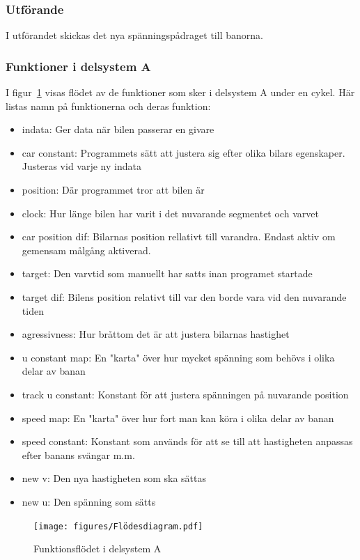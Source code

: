     \subsubsection{Utförande}

    	I utförandet skickas det nya spänningspådraget till banorna. 
	

    \subsubsection{Funktioner i delsystem A}
	I figur~\ref{fig:flow_diagram}  visas flödet av de funktioner som sker i delsystem A under en cykel.
	Här listas namn på funktionerna och deras funktion:
	\begin{itemize}
 		\item indata: Ger data när bilen passerar en givare
		\item car constant: Programmets sätt att justera sig efter olika bilars egenskaper. Justeras vid varje ny indata
 		\item position: Där programmet tror att bilen är
 		\item clock: Hur länge bilen har varit i det nuvarande segmentet och varvet
		\item car position dif: Bilarnas position rellativt till varandra. Endast aktiv om gemensam målgång aktiverad.
		\item target: Den varvtid som manuellt har satts inan programet startade
		\item target dif: Bilens position relativt till var den borde vara vid den nuvarande tiden
		\item agressivness: Hur bråttom det är att justera bilarnas hastighet 
		\item u constant map: En "karta" över hur mycket spänning som behövs i olika delar av banan
		\item track u constant: Konstant för att justera spänningen på nuvarande position
		\item speed map: En "karta" över hur fort man kan köra i olika delar av banan		
		\item speed constant: Konstant som används för att se till att hastigheten anpassas efter banans svängar m.m.
		\item new v: Den nya hastigheten som ska sättas
		 
		\item new u: Den spänning som sätts
	\end{itemize}

	\begin{figure}
  	\centering
  	\texttt{[image: figures/Flödesdiagram.pdf]}
  	\caption{Funktionsflödet i delsystem A}
  	\label{fig:flow_diagram}
	\end{figure}


